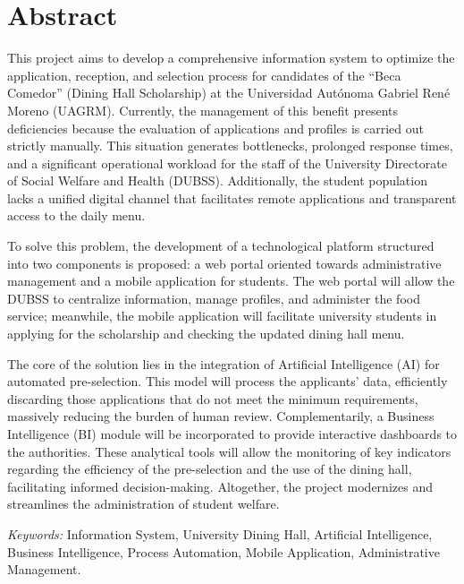 
\section*{Abstract}

This project aims to develop a comprehensive information system to optimize the application, reception, and selection process for candidates of the \enquote{Beca Comedor} (Dining Hall Scholarship) at the Universidad Autónoma Gabriel René Moreno (UAGRM). Currently, the management of this benefit presents deficiencies because the evaluation of applications and profiles is carried out strictly manually. This situation generates bottlenecks, prolonged response times, and a significant operational workload for the staff of the University Directorate of Social Welfare and Health (DUBSS). Additionally, the student population lacks a unified digital channel that facilitates remote applications and transparent access to the daily menu.

To solve this problem, the development of a technological platform structured into two components is proposed: a web portal oriented towards administrative management and a mobile application for students. The web portal will allow the DUBSS to centralize information, manage profiles, and administer the food service; meanwhile, the mobile application will facilitate university students in applying for the scholarship and checking the updated dining hall menu.

The core of the solution lies in the integration of Artificial Intelligence (AI) for automated pre-selection. This model will process the applicants' data, efficiently discarding those applications that do not meet the minimum requirements, massively reducing the burden of human review. Complementarily, a Business Intelligence (BI) module will be incorporated to provide interactive dashboards to the authorities. These analytical tools will allow the monitoring of key indicators regarding the efficiency of the pre-selection and the use of the dining hall, facilitating informed decision-making. Altogether, the project modernizes and streamlines the administration of student welfare.

\indent\textit{Keywords:} Information System, University Dining Hall, Artificial Intelligence, Business Intelligence, Process Automation, Mobile Application, Administrative Management.